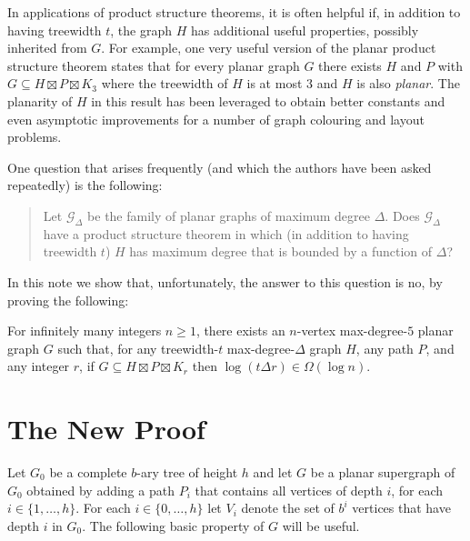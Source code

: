 \documentclass{patmorin}
\begin{document}
In applications of product structure theorems, it is often helpful if, in addition to having treewidth $t$, the graph $H$ has additional useful properties, possibly inherited from $G$.  For example, one very useful version of the planar product structure theorem states that for every planar graph $G$ there exists $H$ and $P$ with $G\subseteq H\boxtimes P\boxtimes K_3$ where the treewidth of $H$ is at most $3$ and $H$ is also \emph{planar}.  The planarity of $H$ in this result has been leveraged to obtain better constants and even asymptotic improvements for a number of graph colouring and layout problems.

One question that arises frequently (and which the authors have been asked repeatedly) is the following:
\begin{quote}
  Let $\mathcal{G}_\Delta$ be the family of planar graphs of maximum degree $\Delta$.  Does $\mathcal{G}_\Delta$ have a product structure theorem in which (in addition to having treewidth $t$) $H$ has maximum degree that is bounded by a function of $\Delta$?
\end{quote}
In this note we show that, unfortunately, the answer to this question is no, by proving the following:

\begin{thm}\label{treewidth_1_bounded_degree}
  For infinitely many integers $n\ge 1$, there exists an $n$-vertex max-degree-$5$ planar graph $G$ such that, for any treewidth-$t$ max-degree-$\Delta$ graph $H$, any path $P$, and any integer $r$,  if $G\subseteq H\boxtimes P\boxtimes K_r$ then $\log(t\Delta r)\in\Omega(\log n)$.
\end{thm}

\section{The New Proof}

Let $G_0$ be a complete $b$-ary tree of height $h$ and let $G$ be a planar supergraph of $G_0$ obtained by adding a path $P_i$ that contains all vertices of depth $i$, for each $i\in\{1,\ldots,h\}$.  For each $i\in\{0,\ldots,h\}$ let $V_i$ denote the set of $b^i$ vertices that have depth $i$ in $G_0$.  The following basic property of $G$ will be useful.
\end{document}
